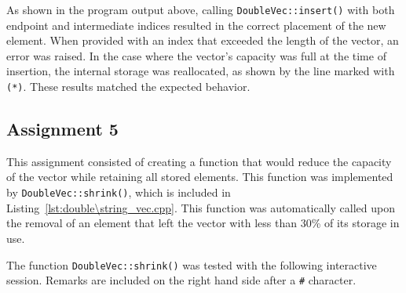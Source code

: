 \documentclass[11pt, letterpaper]{article} %
\begin{document}
As shown in the program output above, calling \texttt{DoubleVec::insert()} with both endpoint and intermediate indices resulted in the correct placement of the new element. When provided with an index that exceeded the length of the vector, an error was raised. In the case where the vector's capacity was full at the time of insertion, the internal storage was reallocated, as shown by the line marked with \texttt{(*)}. These results matched the expected behavior.


\subsection*{Assignment 5}

This assignment consisted of creating a function that would reduce the capacity of the vector while retaining all stored elements. This function was implemented by \texttt{DoubleVec::shrink()}, which is included in Listing~\ref{lst:double\string_vec.cpp}. This function was automatically called upon the removal of an element that left the vector with less than 30\% of its storage in use.

The function \texttt{DoubleVec::shrink()} was tested with the following interactive session. Remarks are included on the right hand side after a \texttt{\#} character.
\end{document}
